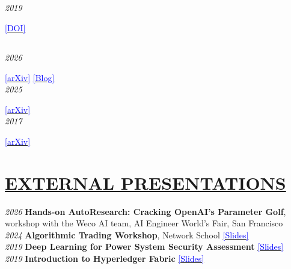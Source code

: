 \documentclass[11pt]{article}
\begin{document}
\subsection*{}
\noindent\textit{2019} \begin{NoHyper}\end{NoHyper} \href{https://doi.org/10.1145/3363347.3363357}{\textcolor{blue}{[DOI]}}
\subsection*{}
\noindent\textit{2026} \begin{NoHyper}\end{NoHyper} \href{https://arxiv.org/abs/2609.26457}{\textcolor{blue}{[arXiv]}} \href{https://www.weco.ai/blog/first-evidence-of-recursive-self-improvement}{\textcolor{blue}{[Blog]}}\\[5mm] %
\noindent\textit{2025} \begin{NoHyper}\end{NoHyper} \href{https://arxiv.org/abs/2502.13138}{\textcolor{blue}{[arXiv]}}\\[5mm] %
\noindent\textit{2017} \begin{NoHyper}\end{NoHyper} \href{https://arxiv.org/abs/1706.10059}{\textcolor{blue}{[arXiv]}}
\vspace{20mm} %

%
\section*{\centering\underline{EXTERNAL PRESENTATIONS}}
\noindent\textit{2026} \textbf{Hands-on AutoResearch: Cracking OpenAI's Parameter Golf}, workshop with the Weco AI team, AI Engineer World's Fair, San Francisco\\[\baselineskip]
\noindent\textit{2024} \textbf{Algorithmic Trading Workshop}, Network School \href{https://slides.dex.moe/Algorithmic-Trading-Workshop/}{\textcolor{blue}{[Slides]}}\\[\baselineskip]
\noindent\textit{2019} \textbf{Deep Learning for Power System Security Assessment} \href{https://slides.dex.moe/dl-power-system-security/}{\textcolor{blue}{[Slides]}}\\[\baselineskip]
\noindent\textit{2019} \textbf{Introduction to Hyperledger Fabric} \href{https://slides.dex.moe/hyperledger-tutorial/}{\textcolor{blue}{[Slides]}}
\vspace{20mm} %
\end{document}
